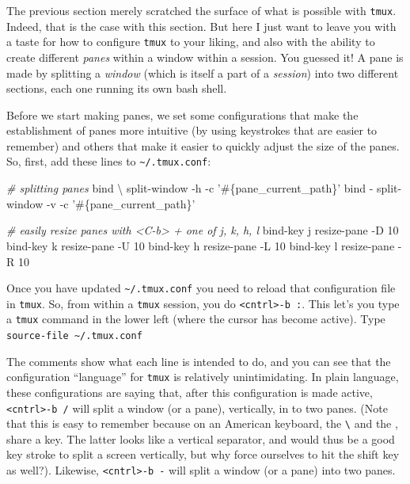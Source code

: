 \documentclass[]{krantz}
\makeatletter
\newenvironment{Shaded}{\begin{snugshade}}{\end{snugshade}}
\newcommand{\BuiltInTok}[1]{#1}
\newcommand{\CommentTok}[1]{\textcolor[rgb]{0.37,0.37,0.37}{\textit{#1}}}
\newcommand{\DataTypeTok}[1]{\textcolor[rgb]{0.27,0.27,0.27}{#1}}
\newcommand{\ExtensionTok}[1]{#1}
\newcommand{\NormalTok}[1]{#1}
\newcommand{\StringTok}[1]{\textcolor[rgb]{0.5,0.5,0.5}{#1}}
\newenvironment{kframe}{%
\medskip{}
\setlength{\fboxsep}{.8em}
 \def\at@end@of@kframe{}%
 \ifinner\ifhmode%
  \def\at@end@of@kframe{\end{minipage}}%
  \begin{minipage}{\columnwidth}%
 \fi\fi%
 \def\FrameCommand##1{\hskip\@totalleftmargin \hskip-\fboxsep
 \colorbox{shadecolor}{##1}\hskip-\fboxsep
     \hskip-\linewidth \hskip-\@totalleftmargin \hskip\columnwidth}%
 \MakeFramed {\advance\hsize-\width
   \@totalleftmargin\z@ \linewidth\hsize
   \@setminipage}}%
 {\par\unskip\endMakeFramed%
 \at@end@of@kframe}
\renewenvironment{Shaded}{\begin{kframe}}{\end{kframe}}
\makeatother
\begin{document}
The previous section merely scratched the surface of what is possible with \texttt{tmux}.\\
Indeed, that is the case with this section. But here I just want to leave you with a
taste for how to configure \texttt{tmux} to your liking, and also with the ability to create
different \emph{panes} within a window within a session. You guessed it! A pane is made by
splitting a \emph{window} (which is itself a part of a \emph{session}) into two different
sections, each one running its own bash shell.

Before we start making panes, we set some configurations that make the
establishment of panes more intuitive (by using keystrokes that are easier
to remember) and others that make it easier to quickly adjust the size of the panes.
So, first, add these lines to \texttt{\textasciitilde{}/.tmux.conf}:

\begin{Shaded}
\begin{Highlighting}[]
\CommentTok{# splitting panes}
\BuiltInTok{bind} \DataTypeTok{\textbackslash{} }\NormalTok{split-window -h -c }\StringTok{'#\{pane_current_path\}'}
\BuiltInTok{bind}\NormalTok{ - split-window -v -c }\StringTok{'#\{pane_current_path\}'}

\CommentTok{# easily resize panes with <C-b> + one of j, k, h, l}
\ExtensionTok{bind-key}\NormalTok{ j resize-pane -D 10}
\ExtensionTok{bind-key}\NormalTok{ k resize-pane -U 10}
\ExtensionTok{bind-key}\NormalTok{ h resize-pane -L 10}
\ExtensionTok{bind-key}\NormalTok{ l resize-pane -R 10}
\end{Highlighting}
\end{Shaded}

Once you have updated \texttt{\textasciitilde{}/.tmux.conf} you need to reload that
configuration file in \texttt{tmux}. So, from within a \texttt{tmux} session,
you do \texttt{\textless{}cntrl\textgreater{}-b\ :}. This let's you type a \texttt{tmux} command in the lower
left (where the cursor has become active). Type \texttt{source-file\ \textasciitilde{}/.tmux.conf}

The comments show what each line is intended to do, and you
can see that the configuration ``language'' for \texttt{tmux} is relatively
unintimidating. In plain language, these configurations are saying that, after this
configuration is made active, \texttt{\textless{}cntrl\textgreater{}-b\ /} will split a window (or a pane),
vertically, in to two panes. (Note that this is easy to remember
because on an American keyboard, the \texttt{\textbackslash{}} and the \texttt{\textbar{}}, share a key. The latter
looks like a vertical separator, and would thus be a good key stroke
to split a screen vertically, but why force ourselves to hit the shift key as well?).
Likewise, \texttt{\textless{}cntrl\textgreater{}-b\ -} will split a window (or a pane) into two panes.
\end{document}
